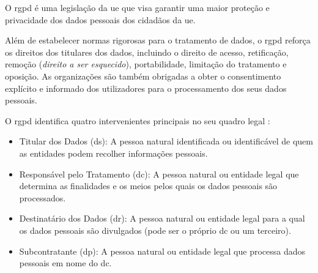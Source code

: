 
O \acrshort{rgpd} é uma legislação da \acrfull{ue} que visa garantir uma maior proteção e privacidade dos dados pessoais dos cidadãos da \acrshort{ue}.

Além de estabelecer normas rigorosas para o tratamento de dados, o \acrshort{rgpd} reforça os direitos dos titulares dos dados, incluindo o direito de acesso, retificação, remoção (\textit{direito a ser esquecido}), portabilidade, limitação do tratamento e oposição. As organizações são também obrigadas a obter o consentimento explícito e informado dos utilizadores para o processamento dos seus dados pessoais. \citep{Daudén-Esmel2024}

O \acrshort{rgpd} identifica quatro intervenientes principais no seu quadro legal \citep{gdpr2016}:  
\begin{itemize}
    \item Titular dos Dados (\acrfull{ds}): A pessoa natural identificada ou identificável de quem as entidades podem recolher informações pessoais.  
    \item Responsável pelo Tratamento (\acrfull{dc}): A pessoa natural ou entidade legal que determina as finalidades e os meios pelos quais os dados pessoais são processados.  
    \item Destinatário dos Dados (\acrfull{dr}): A pessoa natural ou entidade legal para a qual os dados pessoais são divulgados (pode ser o próprio \acrshort{dc} ou um terceiro).  
    \item Subcontratante (\acrfull{dp}): A pessoa natural ou entidade legal que processa dados pessoais em nome do \acrshort{dc}.
\end{itemize}

